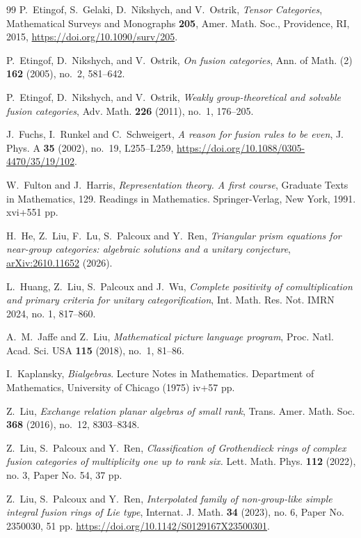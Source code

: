 \documentclass{amsart}
\begin{document}
\begin{thebibliography}{99}
{\sc P.~Etingof, S.~Gelaki, D.~Nikshych, and V.~Ostrik}, {\em Tensor Categories}, Mathematical Surveys and Monographs \textbf{205}, Amer. Math. Soc., Providence, RI, 2015, \url{https://doi.org/10.1090/surv/205}.

{\sc P.~Etingof, D.~Nikshych, and V.~Ostrik}, {\em On fusion categories}, Ann. of Math. (2) \textbf{162} (2005), no.~2, 581--642.

{\sc P.~Etingof, D.~Nikshych, and V.~Ostrik}, {\em Weakly group-theoretical and solvable fusion categories}, Adv. Math. \textbf{226} (2011), no.~1, 176--205.

{\sc J.~Fuchs, I.~Runkel and C.~Schweigert},
{\em A reason for fusion rules to be even},
J. Phys. A \textbf{35} (2002), no.~19, L255--L259, \url{https://doi.org/10.1088/0305-4470/35/19/102}.

{\sc W.~Fulton and J.~Harris}, {\em Representation theory. A first course}, Graduate Texts in Mathematics, 129. Readings in Mathematics. Springer-Verlag, New York, 1991. xvi+551 pp.

{\sc H.~He, Z.~Liu, F.~Lu, S.~Palcoux and Y.~Ren},
{\em Triangular prism equations for near-group categories: algebraic solutions and a unitary conjecture},
\href{https://arxiv.org/abs/2610.11652}{arXiv:2610.11652} (2026).

{\sc L.~Huang, Z.~Liu, S.~Palcoux and J.~Wu}, {\em Complete positivity of comultiplication and primary criteria for unitary categorification}, Int. Math. Res. Not. IMRN 2024, no. 1, 817--860.

{\sc A.~M.~Jaffe and Z.~Liu},
{\em Mathematical picture language program},
Proc. Natl. Acad. Sci. USA \textbf{115} (2018), no.~1, 81--86.

{\sc I.~Kaplansky}, {\em Bialgebras}. Lecture Notes in Mathematics. Department of Mathematics, University of Chicago (1975) iv+57 pp.

{\sc Z.~Liu}, {\em Exchange relation planar algebras of small rank},
Trans. Amer. Math. Soc. \textbf{368} (2016), no.~12, 8303--8348.

{\sc Z.~Liu, S.~Palcoux and Y.~Ren}, {\em Classification of Grothendieck rings of complex fusion categories of multiplicity one up to rank six.} Lett. Math. Phys. \textbf{112} (2022), no. 3, Paper No. 54, 37 pp.

{\sc Z.~Liu, S.~Palcoux and Y.~Ren}, {\em Interpolated family of non-group-like simple integral fusion rings of Lie type}, Internat. J. Math. \textbf{34} (2023), no. 6, Paper No. 2350030, 51 pp. \url{https://doi.org/10.1142/S0129167X23500301}.


\end{thebibliography}
\end{document}
